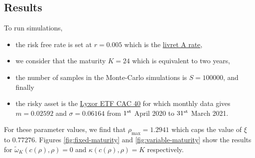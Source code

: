 \documentclass{article}
\begin{document}
\subsection{Results}

To run simulations, 
\begin{itemize}
\item the risk free rate is set at $r = 0.005$ which is the \href{https://www.capital.fr/votre-argent/livret-a-ldds-lep-cel-pee-les-nouveaux-taux-de-votre-epargne-reglementee-au-1er-fevrier-2020-1361121#:~:text=Livret%20A%20%3A%20taux%20%C3%A0%200%2C5%25&text=Pour%20une%20personne%20l'ayant,de%20115%20euros%20par%20an.}{\color{awesomePurple}livret A rate},
\item we consider that the maturity $K = 24$ which is equivalent to two years,
\item the number of samples in the Monte-Carlo simulations is $S = 100000$, and finally
\item the risky asset is the \href{https://www.abcbourse.com/download/valeur/CACp}{\color{awesomePurple}Lyxor ETF CAC 40} for which monthly data gives $m = 0.02592$ and $\sigma = 0.06164$ from $1^\textnormal{st}$ April 2020 to $31^\textnormal{st}$ March 2021.
\end{itemize}

For these parameter values, we find that 
$
\rho_{\max} = 1.2941
$ which caps the value of $\xi$ to $0.77276$. Figures \ref{fig:fixed-maturity} and \ref{fig:variable-maturity} show the results for $\tilde\omega_K(c(\rho), \rho) = 0$ and $\kappa(c(\rho), \rho)= K$ respectively. 
\end{document}
